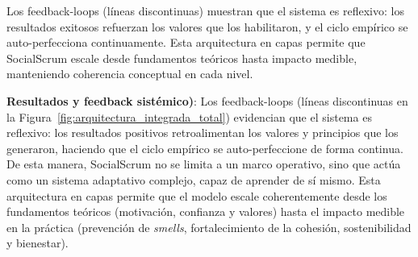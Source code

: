 \FloatBarrier

Los \gls{feedback-loops} (líneas discontinuas) muestran que el sistema es reflexivo: los resultados exitosos refuerzan los valores que los habilitaron, y el ciclo empírico se auto-perfecciona continuamente. Esta arquitectura en capas permite que SocialScrum escale desde fundamentos teóricos hasta impacto medible, manteniendo coherencia conceptual en cada nivel.

\vspace{1em}

\textbf{Resultados y feedback sistémico)}:
Los \gls{feedback-loops} (líneas discontinuas en la Figura~\ref{fig:arquitectura_integrada_total}) evidencian que el sistema es reflexivo: los resultados positivos retroalimentan los valores y principios que los generaron, haciendo que el ciclo empírico se auto-perfeccione de forma continua.
De esta manera, SocialScrum no se limita a un marco operativo, sino que actúa como un sistema adaptativo complejo, capaz de aprender de sí mismo.
Esta arquitectura en capas permite que el modelo escale coherentemente desde los fundamentos teóricos (motivación, confianza y valores) hasta el impacto medible en la práctica (prevención de \textit{smells}, fortalecimiento de la cohesión, sostenibilidad y bienestar).

